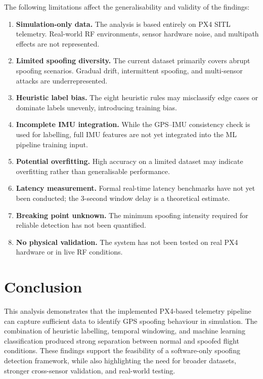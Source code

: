 \documentclass[11pt,a4paper]{article}
\begin{document}
The following limitations affect the generalisability and validity of the findings:

\begin{enumerate}
    \item \textbf{Simulation-only data.} The analysis is based entirely on PX4 SITL telemetry. Real-world RF environments, sensor hardware noise, and multipath effects are not represented.
    \item \textbf{Limited spoofing diversity.} The current dataset primarily covers abrupt spoofing scenarios. Gradual drift, intermittent spoofing, and multi-sensor attacks are underrepresented.
    \item \textbf{Heuristic label bias.} The eight heuristic rules may misclassify edge cases or dominate labels unevenly, introducing training bias.
    \item \textbf{Incomplete IMU integration.} While the GPS--IMU consistency check is used for labelling, full IMU features are not yet integrated into the ML pipeline training input.
    \item \textbf{Potential overfitting.} High accuracy on a limited dataset may indicate overfitting rather than generalisable performance.
    \item \textbf{Latency measurement.} Formal real-time latency benchmarks have not yet been conducted; the 3-second window delay is a theoretical estimate.
    \item \textbf{Breaking point unknown.} The minimum spoofing intensity required for reliable detection has not been quantified.
    \item \textbf{No physical validation.} The system has not been tested on real PX4 hardware or in live RF conditions.
\end{enumerate}

\section{Conclusion}

This analysis demonstrates that the implemented PX4-based telemetry pipeline can capture sufficient data to identify GPS spoofing behaviour in simulation. The combination of heuristic labelling, temporal windowing, and machine learning classification produced strong separation between normal and spoofed flight conditions. These findings support the feasibility of a software-only spoofing detection framework, while also highlighting the need for broader datasets, stronger cross-sensor validation, and real-world testing.
\end{document}
